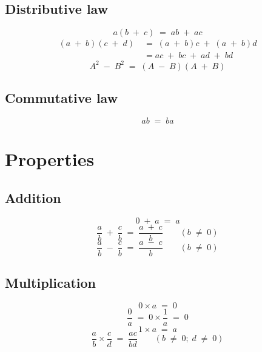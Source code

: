 \subsection{Distributive law}
\[a(b \; + \; c) \; = \; ab \; + \; ac\]
\begin{align*}
(a \; + \; b)(c \; + \; d) \; &= \; (a \; + \; b)c \; + \; (a \; + \; b)d \\
&=ac \; + \;bc \; + \; ad \; + \; bd
\end{align*}
\[A^2 \; - \; B^2 \; = \; (A \; - \; B)(A \; + \; B)\]
\subsection{Commutative law}
\[ab \; = \; ba\]
\section{Properties}
\subsection{Addition}
\[0 \; + \; a \; = \; a\]
\[\frac{a}{b} \; + \; \frac{c}{b} \; = \; \frac{a \; + \; c}{b} \qquad (b \; \neq \; 0)\]
\[\frac{a}{b} \; - \; \frac{c}{b} \; = \; \frac{a \; - \; c}{b} \qquad (b \; \neq \; 0)\]
\subsection{Multiplication}
\[0 \times a \; = \; 0\]
\[\frac{0}{a} \; = \; 0 \times \frac{1}{a} \; = \; 0\]
\[1 \times a \; = \; a\]
\[\frac{a}{b} \times \frac{c}{d} \; = \; \frac{ac}{bd} \qquad (b \; \neq \; 0; \; d \; \neq \; 0)\]
